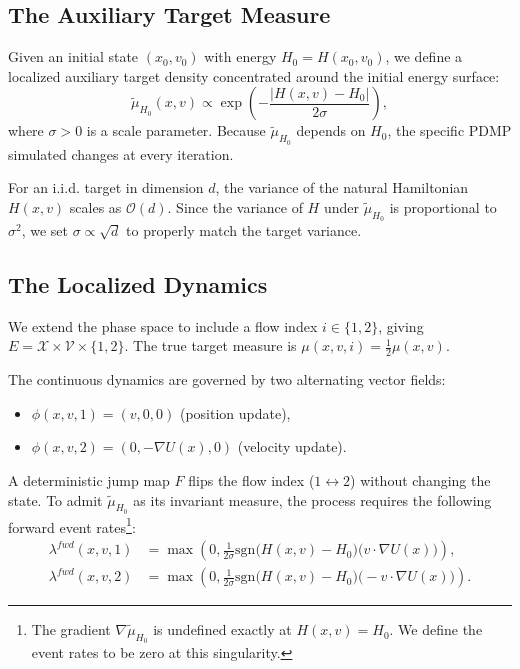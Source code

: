 \documentclass{article}
\begin{document}
\subsection{The Auxiliary Target Measure}
\label{sec:aux_measure}

Given an initial state $(x_0, v_0)$ with energy $H_0 = H(x_0, v_0)$, we define a localized auxiliary target density concentrated around the initial energy surface:
\begin{equation}
    \label{eq:aux_target}
    \tilde{\mu}_{H_0}(x, v) \propto \exp\left(-\frac{|H(x, v) - H_0|}{2\sigma}\right),
\end{equation}
where $\sigma > 0$ is a scale parameter. Because $\tilde{\mu}_{H_0}$ depends on $H_0$, the specific PDMP simulated changes at every iteration.

For an i.i.d. target in dimension $d$, the variance of the natural Hamiltonian $H(x, v)$ scales as $\mathcal{O}(d)$. Since the variance of $H$ under $\tilde{\mu}_{H_0}$ is proportional to $\sigma^2$, we set $\sigma \propto \sqrt{d}$ to properly match the target variance.

\subsection{The Localized Dynamics}
\label{sec:localized_dynamics}

We extend the phase space to include a flow index $i \in \{1, 2\}$, giving $E = \mathcal{X} \times \mathcal{V} \times \{1, 2\}$. The true target measure is $\mu(x, v, i) = \frac{1}{2}\mu(x, v)$. 

The continuous dynamics are governed by two alternating vector fields:
\begin{itemize}
    \item $\phi(x,v,1) = (v,0,0)$ (position update),
    \item $\phi(x,v,2) = (0, -\nabla U(x),0)$ (velocity update).
\end{itemize}
A deterministic jump map $F$ flips the flow index ($1 \leftrightarrow 2$) without changing the state. To admit $\tilde{\mu}_{H_0}$ as its invariant measure, the process requires the following forward event rates\footnote{The gradient $\nabla \tilde{\mu}_{H_0}$ is undefined exactly at $H(x,v) = H_0$. We define the event rates to be zero at this singularity.}:
\begin{align}
    \lambda^{fwd}(x, v,1) &= \max\left(0, \frac{1}{2\sigma} \text{sgn}\big(H(x, v) - H_0\big) \big(v \cdot \nabla U(x)\big)\right), \\
    \lambda^{fwd}(x, v,2) &= \max\left(0, \frac{1}{2\sigma} \text{sgn}\big(H(x, v) - H_0\big) \big(-v \cdot \nabla U(x)\big)\right).
\end{align}
\end{document}
